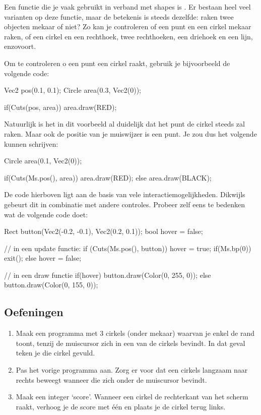 Een functie die je vaak gebruikt in verband met shapes is . Er bestaan heel veel varianten op deze functie, maar de betekenis is steeds dezelfde: raken twee objecten mekaar of niet? Zo kan je controleren of een punt en een cirkel mekaar raken, of een cirkel en een rechthoek, twee rechthoeken, een driehoek en een lijn, enzovoort.

Om te controleren o een punt een cirkel raakt, gebruik je bijvoorbeeld de volgende code:

\begin{code}
Vec2 pos(0.1, 0.1);
Circle area(0.3, Vec2(0));

if(Cuts(pos, area)) area.draw(RED);
\end{code}

Natuurlijk is het in dit voorbeeld al duidelijk dat het punt de cirkel steeds zal raken. Maar ook de positie van je muiswijzer is een punt. Je zou dus het volgende kunnen schrijven:

\begin{code}
Circle area(0.1, Vec2(0));

if(Cuts(Ms.pos(), area)) area.draw(RED);
else area.draw(BLACK);
\end{code}

De code hierboven ligt aan de basis van vele interactiemogelijkheden. Dikwijls gebeurt dit in combinatie met andere controles. Probeer zelf eens te bedenken wat de volgende code doet:

\begin{code}
Rect button(Vec2(-0.2, -0.1), Vec2(0.2, 0.1));
bool hover = false;

// in een update functie:
if (Cuts(Ms.pos(), button)) {
  hover = true;
	if(Ms.bp(0)) exit();
} else hover = false;

// in een draw functie
if(hover) {
  button.draw(Color(0, 255, 0));
} else {
  button.draw(Color(0, 155, 0));
}
\end{code}

\subsection{Oefeningen}
\begin{enumerate}
\item Maak een programma met 3 cirkels (onder mekaar) waarvan je enkel de rand toont, tenzij de muiscursor zich in een van de cirkels bevindt. In dat geval teken je die cirkel gevuld.
\item Pas het vorige programma aan. Zorg er voor dat een cirkels langzaam naar rechts beweegt wanneer die zich onder de muiscursor bevindt.
\item Maak een integer `score'. Wanneer een cirkel de rechterkant van het scherm raakt, verhoog je de score met \'e\'en en plaats je de cirkel terug links.
\end{enumerate}

